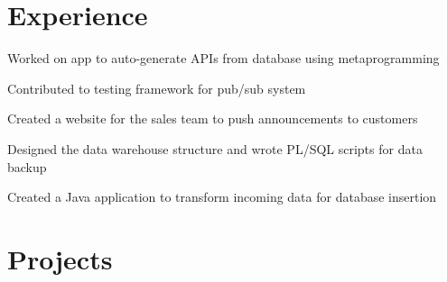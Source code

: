 \documentclass[letterpaper]{deedy-resume} %
\begin{document}
\hfill
%
%
\begin{minipage}[t]{0.66\textwidth} %


\section{Experience}


\vspace{\topsep} %
\begin{tightitemize}
\item Worked on app to auto-generate APIs from database using metaprogramming
\item Contributed to testing framework for pub/sub system
\end{tightitemize}

\sectionspace %



\begin{tightitemize}
\item Created a website for the sales team to push announcements to customers
\item Designed the data warehouse structure and wrote PL/SQL scripts for data backup
\item Created a Java application to transform incoming data for database insertion
\end{tightitemize}

\sectionspace %


\section{Projects}


\end{minipage}
\end{document}
